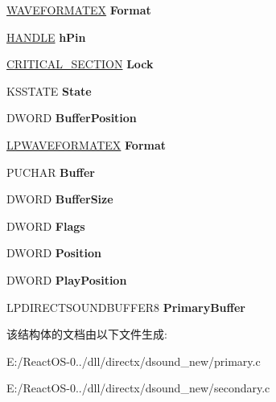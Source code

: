 \begin{DoxyCompactItemize}
\mbox{\label{struct_c_direct_sound_buffer_af9bf6b1099b2f57b35d8115f473fabe1}} 
\hyperlink{struct_w_a_v_e_f_o_r_m_a_t_e_x}{W\+A\+V\+E\+F\+O\+R\+M\+A\+T\+EX} {\bfseries Format}
\item 
\mbox{\label{struct_c_direct_sound_buffer_ac36a045c2acdc5e9ba55b30e3f938553}} 
\hyperlink{interfacevoid}{H\+A\+N\+D\+LE} {\bfseries h\+Pin}
\item 
\mbox{\label{struct_c_direct_sound_buffer_a59fbf0a3b15d6266699fead9d49c4177}} 
\hyperlink{struct___c_r_i_t_i_c_a_l___s_e_c_t_i_o_n}{C\+R\+I\+T\+I\+C\+A\+L\+\_\+\+S\+E\+C\+T\+I\+ON} {\bfseries Lock}
\item 
\mbox{\label{struct_c_direct_sound_buffer_a8410244d3066a8e1ed9b65b011bf06f3}} 
K\+S\+S\+T\+A\+TE {\bfseries State}
\item 
\mbox{\label{struct_c_direct_sound_buffer_ae11455066b4ac2403b77aff081bed4e0}} 
D\+W\+O\+RD {\bfseries Buffer\+Position}
\item 
\mbox{\label{struct_c_direct_sound_buffer_a60200fdd298c011411fcdb9aafc940d7}} 
\hyperlink{struct___w_a_v_e_f_o_r_m_a_t_e_x}{L\+P\+W\+A\+V\+E\+F\+O\+R\+M\+A\+T\+EX} {\bfseries Format}
\item 
\mbox{\label{struct_c_direct_sound_buffer_aeefa7e0d24c8744ca98cfd9a4f82914f}} 
P\+U\+C\+H\+AR {\bfseries Buffer}
\item 
\mbox{\label{struct_c_direct_sound_buffer_a41c3629c3df42535978d0cfb0bd1cedf}} 
D\+W\+O\+RD {\bfseries Buffer\+Size}
\item 
\mbox{\label{struct_c_direct_sound_buffer_a537787977468b99ef1f133c8a3f8eeed}} 
D\+W\+O\+RD {\bfseries Flags}
\item 
\mbox{\label{struct_c_direct_sound_buffer_af4bf938fd07c7d2fc4e9a79925b4581a}} 
D\+W\+O\+RD {\bfseries Position}
\item 
\mbox{\label{struct_c_direct_sound_buffer_ae9df52c9762518f6170a687ce8148922}} 
D\+W\+O\+RD {\bfseries Play\+Position}
\item 
\mbox{\label{struct_c_direct_sound_buffer_acb5e6430925cd9e190cac939b0d2d8e8}} 
L\+P\+D\+I\+R\+E\+C\+T\+S\+O\+U\+N\+D\+B\+U\+F\+F\+E\+R8 {\bfseries Primary\+Buffer}
\end{DoxyCompactItemize}


该结构体的文档由以下文件生成\+:\begin{DoxyCompactItemize}
\item 
E\+:/\+React\+O\+S-\/0../dll/directx/dsound\+\_\+new/primary.\+c\item 
E\+:/\+React\+O\+S-\/0../dll/directx/dsound\+\_\+new/secondary.\+c\end{DoxyCompactItemize}
